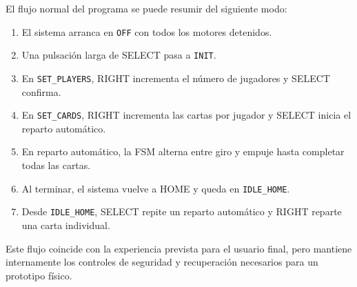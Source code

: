 El flujo normal del programa se puede resumir del siguiente modo:

\begin{enumerate}
    \item El sistema arranca en \texttt{OFF} con todos los motores detenidos.
    \item Una pulsación larga de SELECT pasa a \texttt{INIT}.
    \item En \texttt{SET\_PLAYERS}, RIGHT incrementa el número de jugadores y SELECT confirma.
    \item En \texttt{SET\_CARDS}, RIGHT incrementa las cartas por jugador y SELECT inicia el reparto automático.
    \item En reparto automático, la FSM alterna entre giro y empuje hasta completar todas las cartas.
    \item Al terminar, el sistema vuelve a HOME y queda en \texttt{IDLE\_HOME}.
    \item Desde \texttt{IDLE\_HOME}, SELECT repite un reparto automático y RIGHT reparte una carta individual.
\end{enumerate}

Este flujo coincide con la experiencia prevista para el usuario final, pero mantiene internamente los controles de seguridad y recuperación necesarios para un prototipo físico.
